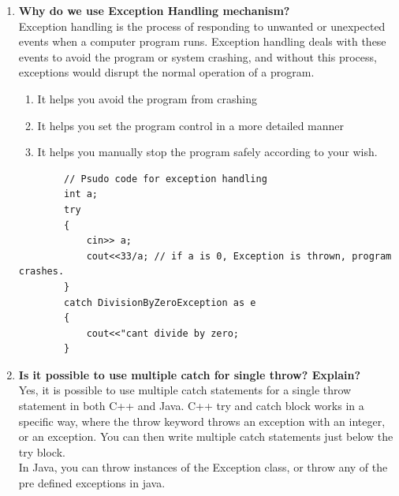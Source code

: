\documentclass[11pt]{article}
\begin{document}
\begin{enumerate}
	\item \textbf{Why do we use Exception Handling mechanism?}\\
	      Exception handling is the process of responding to unwanted or unexpected events when a computer program runs. Exception handling deals with these events to avoid the program or system crashing, and without this process, exceptions would disrupt the normal operation of a program.
	      \begin{enumerate}
		      \item It helps you avoid the program from crashing
		      \item It helps you set the program control in a more detailed manner
		      \item It helps you manually stop the program safely according to your wish.
	      \end{enumerate}
	      \begin{verbatim}
		// Psudo code for exception handling
		int a;
		try
		{
			cin>> a;
			cout<<33/a; // if a is 0, Exception is thrown, program crashes. 
		}
		catch DivisionByZeroException as e
		{
			cout<<"cant divide by zero;
		}
	\end{verbatim}
	\item \textbf{Is it possible to use multiple catch for single throw? Explain?}\\
	      Yes, it is possible to use multiple catch statements for a single throw statement in both C++ and Java. C++ try and catch block works in a specific way, where the throw keyword throws an exception with an integer, or an exception. You can then write multiple catch statements just below the try block.\\
	      In Java, you can throw instances of the Exception class, or throw any of the pre defined exceptions in java.


\end{enumerate}
\end{document}
